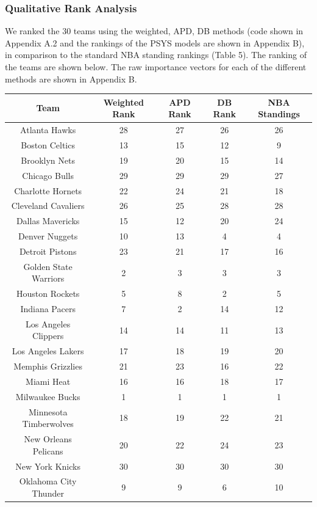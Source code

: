 \documentclass[12pt]{article}%
\begin{document}
\subsubsection{Qualitative Rank Analysis}
\null\quad\quad We ranked the 30 teams using the weighted, APD, DB methods (code shown in Appendix A.2 and the rankings of the PSYS models are shown in Appendix B), in comparison to the standard NBA standing rankings (Table 5). The ranking of the teams are shown below. The raw importance vectors for each of the different methods are shown in Appendix B.
\begin{center}
\begin{tabular}{|c|c |c |c| c|}
\hline
\textbf{Team} & \textbf{Weighted Rank} & \textbf{APD Rank} & \textbf{DB Rank} & \textbf{NBA Standings}\\
\hline
Atlanta Hawks & 28& 27& 26&26\\\hline
Boston Celtics &13 &15 &12&9 \\\hline
Brooklyn Nets & 19& 20&15 &14\\\hline
Chicago Bulls & 29& 29& 29&27\\\hline
Charlotte Hornets & 22& 24&21&18 \\\hline
Cleveland Cavaliers &26 & 25& 28&28 \\\hline
Dallas Mavericks & 15&12 &20&24 \\\hline
Denver Nuggets & 10& 13&4&4 \\\hline
Detroit Pistons & 23& 21&17&16 \\\hline
Golden State Warriors & 2& 3&3&3 \\\hline
Houston Rockets & 5&8 &2&5 \\\hline
Indiana Pacers & 7& 2& 14&12\\\hline
Los Angeles Clippers &14 & 14&11& 13\\\hline
Los Angeles Lakers & 17& 18&19&20 \\\hline
Memphis Grizzlies & 21& 23&16&22 \\\hline
Miami Heat & 16& 16&18&17 \\\hline
Milwaukee Bucks & 1& 1& 1&1\\\hline
Minnesota Timberwolves & 18& 19&22&21 \\\hline
New Orleans Pelicans & 20& 22&24&23 \\\hline
New York Knicks & 30& 30& 30&30\\\hline
Oklahoma City Thunder &9 &9 &6&10 \\\hline

\end{tabular}
\end{center}
\end{document}
